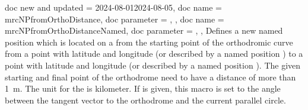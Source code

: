 \clearpage

\begin{docCommands}[
  ]{
    {
      doc new and updated = {2024-08-01}{2024-08-05},
      doc name        = mrcNPfromOrthoDistance,
      doc parameter   = ,
    },
    {
      doc name        = mrcNPfromOrthoDistanceNamed,
      doc parameter   = ,
    },
  }
  Defines a new named position  which is located on a 
  from the starting point of the orthodromic curve
  from a point with
  latitude  and longitude  (or described by a named position )
  to a point with
  latitude  and longitude  (or described by a named position ).
  The given starting and final point of the orthodrome need to have a distance of more than
  \SI{1}{\meter}. The unit for the  is kilometer.
  If  is given, this macro is set to the
  angle between the tangent vector to the orthodrome and
  the current parallel circle.

%
\begin{dispExample}
\end{dispExample}
\end{docCommands}




\clearpage
